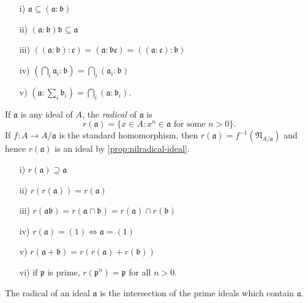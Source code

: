 \begin{exercise}
    \begin{enumerate}
    \item[i)] $\mathfrak{a} \subseteq (\mathfrak{a} : \mathfrak{b})$
    \item[ii)] $(\mathfrak{a} : \mathfrak{b})\mathfrak{b} \subseteq \mathfrak{a}$
    \item[iii)] $((\mathfrak{a} : \mathfrak{b}) : \mathfrak{c}) = (\mathfrak{a} : \mathfrak{b}\mathfrak{c}) = ((\mathfrak{a} : \mathfrak{c}) : \mathfrak{b})$
    \item[iv)] $\left(\bigcap_i \mathfrak{a}_i : \mathfrak{b}\right) = \bigcap_i (\mathfrak{a}_i : \mathfrak{b})$
    \item[v)] $(\mathfrak{a} : \sum_i \mathfrak{b}_i) = \bigcap_i (\mathfrak{a} : \mathfrak{b}_i)$.
\end{enumerate}
\end{exercise}

If $\mathfrak{a}$ is any ideal of $A$, the \emph{radical} of $\mathfrak{a}$ is
\[
r(\mathfrak{a}) = \{x \in A : x^n \in \mathfrak{a} \text{ for some } n > 0\}.
\]
If $f \colon A \to A/\mathfrak{a}$ is the standard homomorphism, then $r(\mathfrak{a}) = f^{-1}(\mathfrak{N}_{A/\mathfrak{a}})$ and hence $r(\mathfrak{a})$ is an ideal by \eqref{prop:nilradical-ideal}.

\begin{exercise}\label{exer:radical-properties}
    \begin{enumerate}
    \item[i)] $r(\mathfrak{a}) \supseteq \mathfrak{a}$
    \item[ii)] $r(r(\mathfrak{a})) = r(\mathfrak{a})$
    \item[iii)] $r(\mathfrak{a}\mathfrak{b}) = r(\mathfrak{a} \cap \mathfrak{b}) = r(\mathfrak{a}) \cap r(\mathfrak{b})$
    \item[iv)] $r(\mathfrak{a}) = (1) \iff \mathfrak{a} = (1)$
    \item[v)] $r(\mathfrak{a} + \mathfrak{b}) = r(r(\mathfrak{a}) + r(\mathfrak{b}))$
    \item[vi)] if $\mathfrak{p}$ is prime, $r(\mathfrak{p}^n) = \mathfrak{p}$ for all $n > 0$.
\end{enumerate}
\end{exercise}

\begin{proposition}\label{prop:radical-intersection-primes}
The radical of an ideal $\mathfrak{a}$ is the intersection of the prime ideals which contain $\mathfrak{a}$.
\end{proposition}


